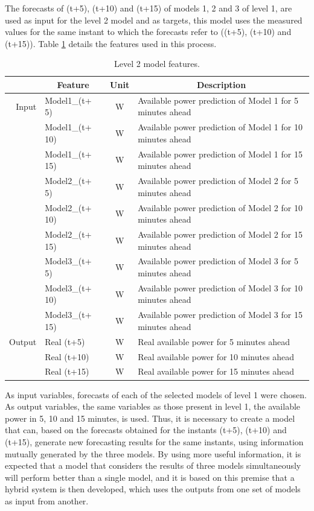 The forecasts of (t+5), (t+10) and (t+15) of models 1, 2 and 3 of level 1, are used as input for the 
level 2 model and as targets, this model uses the measured values for the same instant to which the forecasts refer to ((t+5), (t+10) and (t+15)). Table \ref{table:Enseble} details the features used in this process.

\begin{table}[htbp]
  \centering
  \caption{Level 2 model features.}
    \begin{tabular}{rlcl}
    \toprule
          & \multicolumn{1}{c}{\textbf{Feature}} & \textbf{Unit} & \multicolumn{1}{c}{\textbf{Description}} \\
    \midrule
    Input & Model1\_(t+ 5) & W     & Available power prediction of Model 1 for 5 minutes ahead \\
          & Model1\_(t+ 10) & W     & Available power prediction of Model 1 for 10 minutes ahead \\
          & Model1\_(t+ 15) & W     & Available power prediction of Model 1 for 15 minutes ahead \\
          & Model2\_(t+ 5) & W     & Available power prediction of Model 2 for 5 minutes ahead \\
          & Model2\_(t+ 10) & W     & Available power prediction of Model 2 for 10 minutes ahead \\
          & Model2\_(t+ 15) & W     & Available power prediction of Model 2 for 15 minutes ahead \\
          & Model3\_(t+ 5) & W     & Available power prediction of Model 3 for 5 minutes ahead \\
          & Model3\_(t+ 10) & W     & Available power prediction of Model 3 for 10 minutes ahead \\
          & Model3\_(t+ 15) & W     & Available power prediction of Model 3 for 15 minutes ahead \\
    \midrule
    Output & Real (t+5) & W     & Real available power for 5 minutes ahead \\
          & Real (t+10) & W     & Real available power for 10 minutes ahead \\
          & Real (t+15) & W     & Real available power for 15 minutes ahead \\
    \end{tabular}%
  \label{table:Enseble}%
\end{table}%

As input variables, forecasts of each of the selected models of level 1 were chosen. As output variables, the same variables as those present in level 1, the available power in 5, 10 and 15 minutes, is used. Thus, it is necessary to create a model that can, based on the forecasts obtained for the instants (t+5), (t+10) and (t+15), generate new forecasting results for the same instants, using information mutually generated by the three models. By using more useful information, it is expected that a model that considers the results of three models simultaneously will perform better than a single model, and it is based on this premise that a hybrid system is then developed, which uses the outputs from one set of models as input from another.

